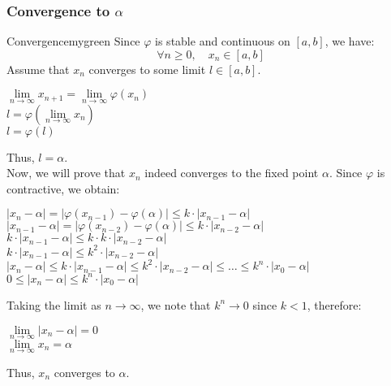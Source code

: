 \subsubsection{Convergence to \(\alpha\)}
\begin{prettyBox}{Convergence}{mygreen}
Since \(\varphi\) is stable and continuous on \([a,b]\), we have:
\[
\forall n \geq 0, \quad x_n \in [a,b]
\]
Assume that \(x_n\) converges to some limit \( l \in [a,b] \).

\begin{center}
    \(\lim\limits_{n \to \infty} x_{n+1} = \lim\limits_{n \to \infty} \varphi(x_n)\)\\[0.15cm]
    \(l = \varphi(\lim\limits_{n \to \infty} x_n)\)\\[0.15cm]
    \(\boxed{l = \varphi(l)}\) 
\end{center}

Thus, \( l = \alpha \).\\[0.15cm]
Now, we will prove that \(x_n\) indeed converges to the fixed point \(\alpha\).  
Since \(\varphi\) is contractive, we obtain:

\begin{center}
    \(|x_n - \alpha| = |\varphi(x_{n-1}) - \varphi(\alpha)| \leq k\cdot|x_{n-1}-\alpha|\)\\[0.15cm] 
    \(|x_{n-1} - \alpha| = |\varphi(x_{n-2}) - \varphi(\alpha)| \leq k\cdot|x_{n-2}-\alpha|\)\\[0.15cm]
    \(k\cdot|x_{n-1} - \alpha|  \leq k\cdot k\cdot|x_{n-2}-\alpha|\)\\[0.15cm]
    \(k\cdot|x_{n-1} - \alpha|  \leq k^2\cdot|x_{n-2}-\alpha|\)\\[0.15cm]
    \(|x_n - \alpha| \leq k\cdot|x_{n-1} - \alpha|  \leq k^2\cdot|x_{n-2}-\alpha| \leq \dots \leq k^n \cdot |x_0 - \alpha|\)\\[0.15cm]
    \(\boxed{0 \leq |x_n - \alpha| \leq k^n \cdot |x_0 - \alpha|}\)
\end{center}
\vspace{0.15cm}
Taking the limit as \( n \to \infty \), we note that \( k^n \to 0 \) since \( k < 1 \), therefore:

\begin{center}
    \(\lim\limits_{n \to \infty} |x_n - \alpha| = 0\)\\[0.1cm]
    \(\boxed{\lim\limits_{n \to \infty} x_n = \alpha}\)
\end{center}

Thus, \( x_n \) converges to \( \alpha \).
\end{prettyBox}

